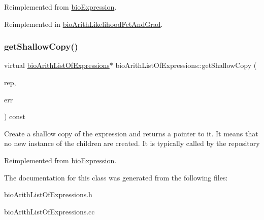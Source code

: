 Reimplemented from \hyperlink{classbio_expression_a2353a4afb3a2b0af7c63aba086a72bde}{bio\+Expression}.



Reimplemented in \hyperlink{classbio_arith_likelihood_fct_and_grad_ad181305327744af1de885d4169888378}{bio\+Arith\+Likelihood\+Fct\+And\+Grad}.

\mbox{\label{classbio_arith_list_of_expressions_afd5867cdac9cea54a704a075412b3c08}} 
\subsubsection{\texorpdfstring{get\+Shallow\+Copy()}{getShallowCopy()}}
{\footnotesize\ttfamily virtual \hyperlink{classbio_arith_list_of_expressions}{bio\+Arith\+List\+Of\+Expressions}$\ast$ bio\+Arith\+List\+Of\+Expressions\+::get\+Shallow\+Copy (\begin{DoxyParamCaption}\item[{\hyperlink{classbio_expression_repository}{bio\+Expression\+Repository} $\ast$}]{rep,  }\item[{pat\+Error $\ast$\&}]{err }\end{DoxyParamCaption}) const\hspace{0.3cm}{\ttfamily [virtual]}}

Create a shallow copy of the expression and returns a pointer to it. It means that no new instance of the children are created. It is typically called by the repository 

Reimplemented from \hyperlink{classbio_expression_a442534762693b92baaf33928979a1bf8}{bio\+Expression}.



The documentation for this class was generated from the following files\+:\begin{DoxyCompactItemize}
\item 
bio\+Arith\+List\+Of\+Expressions.\+h\item 
bio\+Arith\+List\+Of\+Expressions.\+cc\end{DoxyCompactItemize}
